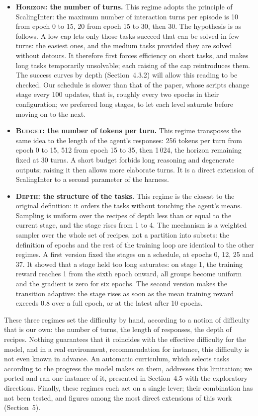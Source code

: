 \documentclass[11pt,a4paper]{article}
\begin{document}
\begin{itemize}
    \item \textbf{\textsc{Horizon}: the number of turns.} This regime adopts the principle of ScalingInter: the maximum number of interaction turns per episode is 10 from epoch 0 to 15, 20 from epoch 15 to 30, then 30. The hypothesis is as follows. A low cap lets only those tasks succeed that can be solved in few turns: the easiest ones, and the medium tasks provided they are solved without detours. It therefore first forces efficiency on short tasks, and makes long tasks temporarily unsolvable; each raising of the cap reintroduces them. The success curves by depth (Section~4.3.2) will allow this reading to be checked. Our schedule is slower than that of the paper, whose scripts change stage every 100 updates, that is, roughly every two epochs in their configuration; we preferred long stages, to let each level saturate before moving on to the next.
    \item \textbf{\textsc{Budget}: the number of tokens per turn.} This regime transposes the same idea to the length of the agent's responses: 256 tokens per turn from epoch 0 to 15, 512 from epoch 15 to 35, then 1\,024, the horizon remaining fixed at 30 turns. A short budget forbids long reasoning and degenerate outputs; raising it then allows more elaborate turns. It is a direct extension of ScalingInter to a second parameter of the harness.
    \item \textbf{\textsc{Depth}: the structure of the tasks.} This regime is the closest to the original definition: it orders the tasks without touching the agent's means. Sampling is uniform over the recipes of depth less than or equal to the current stage, and the stage rises from 1 to 4. The mechanism is a weighted sampler over the whole set of recipes, not a partition into subsets: the definition of epochs and the rest of the training loop are identical to the other regimes. A first version fixed the stages on a schedule, at epochs 0, 12, 25 and 37. It showed that a stage held too long saturates: on stage 1, the training reward reaches 1 from the sixth epoch onward, all groups become uniform and the gradient is zero for six epochs. The second version makes the transition adaptive: the stage rises as soon as the mean training reward exceeds 0.8 over a full epoch, or at the latest after 10 epochs.
\end{itemize}

These three regimes set the difficulty by hand, according to a notion of difficulty that is our own: the number of turns, the length of responses, the depth of recipes. Nothing guarantees that it coincides with the effective difficulty for the model, and in a real environment, recommendation for instance, this difficulty is not even known in advance. An automatic curriculum, which selects tasks according to the progress the model makes on them, addresses this limitation; we ported and ran one instance of it, presented in Section~4.5 with the exploratory directions. Finally, these regimes each act on a single lever; their combination has not been tested, and figures among the most direct extensions of this work (Section~5).
\end{document}

